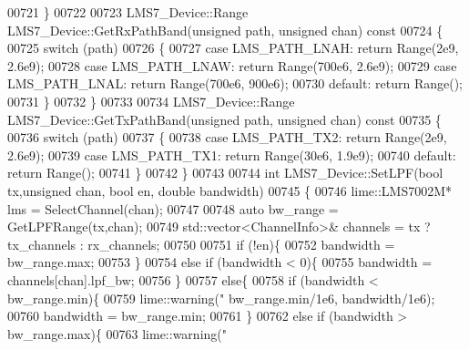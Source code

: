 \begin{DoxyCode}
00721 \}
00722 
00723 LMS7_Device::Range LMS7_Device::GetRxPathBand(\textcolor{keywordtype}{unsigned} path, \textcolor{keywordtype}{unsigned} chan)\textcolor{keyword}{ const}
00724 \textcolor{keyword}{}\{
00725   \textcolor{keywordflow}{switch} (path)
00726   \{
00727       \textcolor{keywordflow}{case} LMS_PATH_LNAH: \textcolor{keywordflow}{return} Range(2e9, 2.6e9);
00728       \textcolor{keywordflow}{case} LMS_PATH_LNAW: \textcolor{keywordflow}{return} Range(700e6, 2.6e9);
00729       \textcolor{keywordflow}{case} LMS_PATH_LNAL: \textcolor{keywordflow}{return} Range(700e6, 900e6);
00730       \textcolor{keywordflow}{default}: \textcolor{keywordflow}{return} Range();
00731   \}
00732 \}
00733 
00734 LMS7_Device::Range LMS7_Device::GetTxPathBand(\textcolor{keywordtype}{unsigned} path, \textcolor{keywordtype}{unsigned} chan)\textcolor{keyword}{ const}
00735 \textcolor{keyword}{}\{
00736   \textcolor{keywordflow}{switch} (path)
00737   \{
00738       \textcolor{keywordflow}{case} LMS_PATH_TX2: \textcolor{keywordflow}{return} Range(2e9, 2.6e9);
00739       \textcolor{keywordflow}{case} LMS_PATH_TX1: \textcolor{keywordflow}{return} Range(30e6, 1.9e9);
00740       \textcolor{keywordflow}{default}: \textcolor{keywordflow}{return} Range();
00741   \}
00742 \}
00743 
00744 \textcolor{keywordtype}{int} LMS7_Device::SetLPF(\textcolor{keywordtype}{bool} tx,\textcolor{keywordtype}{unsigned} chan, \textcolor{keywordtype}{bool} en, \textcolor{keywordtype}{double} bandwidth)
00745 \{
00746     lime::LMS7002M* lms = SelectChannel(chan);
00747 
00748     \textcolor{keyword}{auto} bw\_range = GetLPFRange(tx,chan);
00749     std::vector<ChannelInfo>& channels = tx ? tx_channels : rx_channels;
00750 
00751     \textcolor{keywordflow}{if} (!en)\{
00752         bandwidth = bw\_range.max;
00753     \}
00754     \textcolor{keywordflow}{else} \textcolor{keywordflow}{if} (bandwidth < 0)\{
00755         bandwidth = channels[chan].lpf\_bw;
00756     \}
00757     \textcolor{keywordflow}{else}\{
00758         \textcolor{keywordflow}{if} (bandwidth < bw\_range.min)\{
00759             lime::warning(\textcolor{stringliteral}{"%
      bw\_range.min/1e6, bandwidth/1e6);
00760             bandwidth = bw\_range.min;
00761         \}
00762         \textcolor{keywordflow}{else} \textcolor{keywordflow}{if} (bandwidth > bw\_range.max)\{
00763             lime::warning(\textcolor{stringliteral}{"%
}}
\end{DoxyCode}
